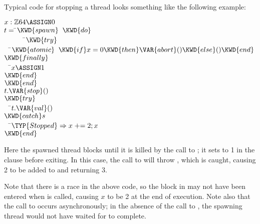 Typical code for stopping a thread looks something like the following
example:
\begin{Fortress}
\(x \mathrel{\mathtt{:}} \mathbb{Z}64 \ASSIGN 0\)\\
\(t = \null\)\pushtabs\=\+\(\KWD{spawn}\;\;\KWD{do}\)\\
{\tt~~~~~~}\pushtabs\=\+\(      \KWD{try}\)\\
{\tt~~}\pushtabs\=\+\(        \KWD{atomic}\;\;\KWD{if} x=0 \KWD{then} \VAR{abort}() \KWD{else} () \KWD{end}\)\-\\\poptabs
\(      \KWD{finally}\)\\
{\tt~~}\pushtabs\=\+\(        x \ASSIGN 1\)\-\\\poptabs
\(      \KWD{end}\)\-\\\poptabs
\(    \KWD{end}\)\-\\\poptabs
\(t.\VAR{stop}()\)\\
\(\KWD{try}\)\\
{\tt~~}\pushtabs\=\+\(  t.\VAR{val}()\)\-\\\poptabs
\(\KWD{catch} s\)\\
{\tt~~}\pushtabs\=\+\(  \TYP{Stopped} \Rightarrow x \mathrel{+}= 2; x\)\-\\\poptabs
\(\KWD{end}\)
\end{Fortress}
Here the spawned thread  blocks until it is killed by the call
to ; it sets  to 1 in the
 clause before exiting.  In this case, the call to
 will throw , which is caught,
causing 2 to be added to  and returning 3.

Note that there is a race in the above code, so the  block in
 may not have been entered when  is
called, causing $x$ to be 2 at the end of execution.  Note also that
the call to  occurs asynchronously; in the
absence of the call to , the spawning thread
would not have waited for  to complete.
